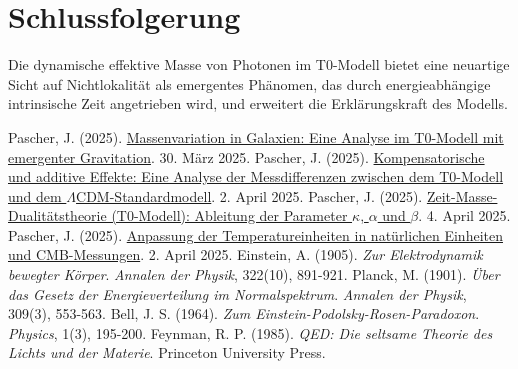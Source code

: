 \documentclass[12pt,a4paper]{article}
\begin{document}
	\section{Schlussfolgerung}
	Die dynamische effektive Masse von Photonen im T0-Modell bietet eine neuartige Sicht auf Nichtlokalität als emergentes Phänomen, das durch energieabhängige intrinsische Zeit angetrieben wird, und erweitert die Erklärungskraft des Modells.
	
	\begin{thebibliography}{99}
		 Pascher, J. (2025). \href{https://github.com/jpascher/T0-Time-Mass-Duality/tree/main/2/pdf/Deutsch/Massenvariation in Galaxien.pdf}{Massenvariation in Galaxien: Eine Analyse im T0-Modell mit emergenter Gravitation}. 30. März 2025.
		 Pascher, J. (2025). \href{https://github.com/jpascher/T0-Time-Mass-Duality/tree/main/2/pdf/Deutsch/Analyse der Messdifferenzen zwischen dem T0-Modell und dem Standardmodell.pdf}{Kompensatorische und additive Effekte: Eine Analyse der Messdifferenzen zwischen dem T0-Modell und dem \(\Lambda\)CDM-Standardmodell}. 2. April 2025.
		 Pascher, J. (2025). \href{https://github.com/jpascher/T0-Time-Mass-Duality/tree/main/2/pdf/Deutsch/Zeit-Masse-Dualitätstheorie (T0-Modell) Herleitung der Parameter kappa, alpha und beta.pdf}{Zeit-Masse-Dualitätstheorie (T0-Modell): Ableitung der Parameter \(\kappa\), \(\alpha\) und \(\beta\)}. 4. April 2025.
		 Pascher, J. (2025). \href{https://github.com/jpascher/T0-Time-Mass-Duality/tree/main/2/pdf/Deutsch/Anpassung von Temperatureinheiten in natürlichen Einheiten und CMB-Messungen.pdf}{Anpassung der Temperatureinheiten in natürlichen Einheiten und CMB-Messungen}. 2. April 2025.
		 Einstein, A. (1905). \textit{Zur Elektrodynamik bewegter Körper}. \textit{Annalen der Physik}, 322(10), 891-921.
		 Planck, M. (1901). \textit{Über das Gesetz der Energieverteilung im Normalspektrum}. \textit{Annalen der Physik}, 309(3), 553-563.
		 Bell, J. S. (1964). \textit{Zum Einstein-Podolsky-Rosen-Paradoxon}. \textit{Physics}, 1(3), 195-200.
		 Feynman, R. P. (1985). \textit{QED: Die seltsame Theorie des Lichts und der Materie}. Princeton University Press.
	\end{thebibliography}
	
\end{document}
